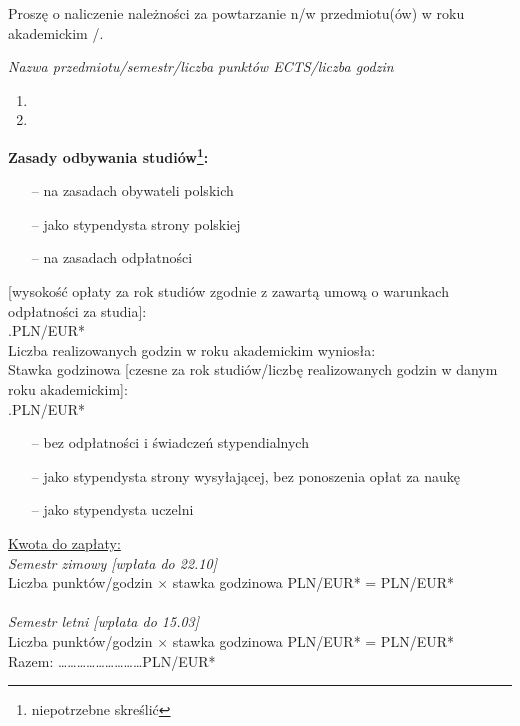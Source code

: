 \documentclass{wmiisubmission}
\begin{document}
\cracowdate
{}
\studentaddress
\addressee[-3em]{\piotrniemiec}

Proszę o naliczenie należności za powtarzanie n/w przedmiotu(ów) w roku\\
akademickim \fillField{1cm}/\fillField{1cm}.

\textit{Nazwa przedmiotu/semestr/liczba punktów ECTS/liczba godzin}
\begin{enumerate}
    \item \dotfill
    \item \dotfill
\end{enumerate}{\footnotesize
\textbf{Zasady odbywania studiów\footnote[1]{niepotrzebne skreślić}:}
\begin{itemize}
    \itemsep-0.7em
    \item[--] na zasadach obywateli polskich
    \item[--] jako stypendysta strony polskiej
    \item[--] na zasadach odpłatności
\end{itemize}
[wysokość opłaty za rok studiów zgodnie z zawartą umową o warunkach odpłatności
 za studia]:\\ .\dotfill PLN/EUR*\\
Liczba realizowanych godzin w roku akademickim \dotfill wyniosła: \dotfill\\
Stawka godzinowa [czesne za rok studiów/liczbę realizowanych godzin w danym roku
akademickim]: \\ .\dotfill PLN/EUR*
\begin{itemize}
    \itemsep-0.7em
    \item[--] bez odpłatności i świadczeń stypendialnych
    \item[--] jako stypendysta strony wysyłającej, bez ponoszenia opłat za naukę
    \item[--] jako stypendysta uczelni
\end{itemize}
}

{\footnotesize
\noindent
\underline{Kwota do zapłaty:}\\
\textit{Semestr zimowy [wpłata do 22.10]}\\
Liczba punktów/godzin \dotfill $\times$ stawka godzinowa \dotfill PLN/EUR* = \dotfill PLN/EUR* \\\\
\textit{Semestr letni [wpłata do 15.03]}\\
Liczba punktów/godzin \dotfill $\times$ stawka godzinowa \dotfill PLN/EUR* = \dotfill PLN/EUR* \\

\hspace{\fill} Razem: \ldots\ldots\ldots\ldots\ldots\ldots\ldots\ldots\ldots PLN/EUR* \hspace{2.0cm}
}

\vskip 0.6cm

\studentsignature

\vskip 1.0cm

\end{document}
